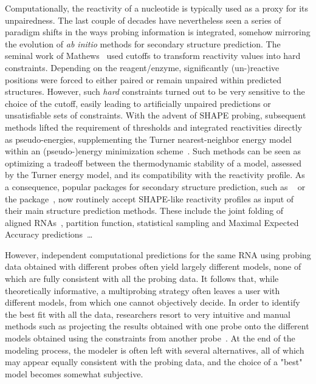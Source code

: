 \documentclass[a4,center,fleqn]{NAR}
\newcommand{\Software}[1]{\text{\ttfamily\bfseries #1}}
\begin{document}
\enlargethispage{-50.1pt}


Computationally, the reactivity of a nucleotide is typically used as a proxy for its unpairedness. The last couple of decades have nevertheless seen a series of paradigm shifts in the ways probing information is integrated, somehow mirroring the evolution of {\em ab initio} methods for secondary structure prediction. The seminal work of Mathews~\cite{Mathews2004} used cutoffs to transform reactivity values into hard constraints. Depending on the reagent/enzyme, significantly (un-)reactive positions were forced to either paired or remain unpaired within predicted structures. However, such \emph{hard} constraints turned out to be very sensitive to the choice of the cutoff, easily leading to artificially unpaired predictions or unsatisfiable sets of constraints. With the advent of SHAPE probing, subsequent methods lifted the requirement of thresholds and integrated reactivities directly as pseudo-energies, supplementing the Turner nearest-neighbor energy model~\cite{Turner2010} within an (pseudo-)energy minimization scheme~\cite{Deigan2009,Zarringhalam2012,Washietl2012}. Such methods can be seen as optimizing a tradeoff between the thermodynamic stability of a model, assessed by the Turner energy model, and its compatibility with the reactivity profile. As a consequence, popular packages for secondary structure prediction, such as \Software{RNAStructure}~\cite{Mathews2004} or the \Software{Vienna} package~\cite{Lorenz2011}, now routinely accept SHAPE-like reactivity profiles as input of their main structure prediction methods. These include the joint folding of aligned RNAs~\cite{Lavender2015}, partition function, statistical sampling and Maximal Expected Accuracy predictions~\cite{Spasic2017}\ldots 

However, independent computational predictions for the same RNA using probing data obtained with different probes often yield largely different models, none of which are fully consistent with all the probing data. It follows that, while theoretically informative, a multiprobing strategy often leaves a user with different models, from which one cannot objectively decide. In order to identify the best fit with all the data, researchers resort to very intuitive and manual methods such as projecting the results obtained with one probe onto the different models obtained using the constraints from another probe~\cite{Herbreteau2005,James2008,Weill2004}. At the end of the modeling process, the modeler is often left with several alternatives, all of which may appear equally consistent with the probing data, and the choice of a "best" model becomes somewhat subjective. 
\end{document}
